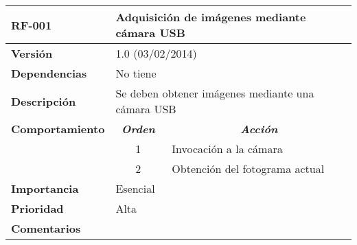 \begin{tabular}{|l|l|p{10cm}|}
\hline
\textbf{RF-001}& \multicolumn{2}{l|}{\textbf{Adquisición de imágenes mediante cámara USB}}                                                       \\ \hline
\textbf{Versión}        & \multicolumn{2}{l|}{1.0 (03/02/2014)}                                                                                           \\ \hline
\textbf{Dependencias}   & \multicolumn{2}{l|}{No tiene}                                                                                                   \\ \hline
\textbf{Descripción}    & \multicolumn{2}{l|}{Se deben obtener imágenes mediante  una cámara USB}                                                         \\ \hline
\textbf{Comportamiento} & \multicolumn{1}{c|}{\textit{\textbf{Orden}}} & \multicolumn{1}{c|}{\textit{\textbf{Acción}}}                                    \\ \hline
                        & \multicolumn{1}{c|}{1}                       & Invocación a la cámara                                                           \\ \cline{2-3} 
                        & \multicolumn{1}{c|}{2}                       & Obtención del fotograma actual                                                   \\ \hline 
\textbf{Importancia}    & \multicolumn{2}{l|}{Esencial}                                                                                                   \\ \hline
\textbf{Prioridad}      & \multicolumn{2}{l|}{Alta}                                                                                                       \\ \hline
\textbf{Comentarios}    & \multicolumn{2}{l|}{}                                                                                                           \\ \hline
\end{tabular}


